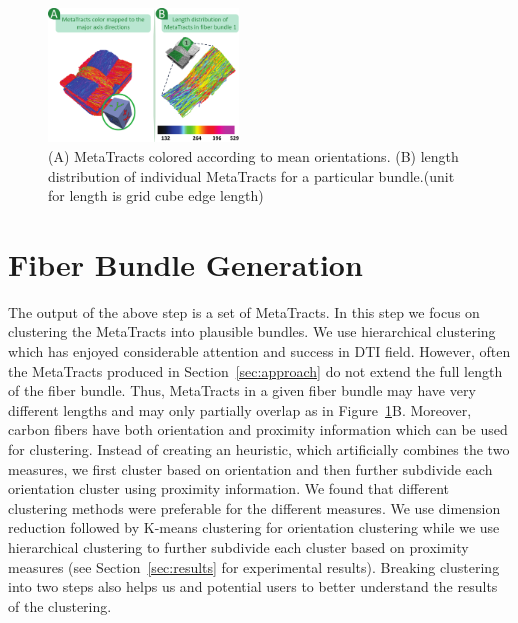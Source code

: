 

\begin{figure}[tb]
\centering
		\includegraphics[width=0.45\textwidth]{imagesMT2014/figure5.pdf}
	\caption{(A) MetaTracts colored according to mean orientations. (B) length distribution of individual MetaTracts for a particular bundle.(unit for length is grid cube edge length)}
	\label{fig:length_distribution}
\end{figure}


\section {Fiber Bundle Generation}
\label{subsec:fiber-bundles}
The output of the above step is a set of MetaTracts. In this step we focus on clustering the MetaTracts into plausible bundles. We use hierarchical clustering which has enjoyed considerable attention and success in DTI field. However, often the MetaTracts produced in Section~\ref{sec:approach} do not extend the full length of the fiber bundle. Thus, MetaTracts in a given fiber bundle may have very different lengths and may only partially overlap as in Figure~\ref{fig:length_distribution}B. Moreover, carbon fibers have both orientation and proximity information which can be used for clustering. Instead of creating an heuristic, which artificially combines the two measures, we first cluster based on orientation and then further subdivide each orientation cluster using proximity information. We found that different clustering methods were preferable for the different measures. We use dimension reduction followed by K-means clustering for orientation clustering while we use hierarchical clustering to further subdivide each cluster based on proximity measures (see Section~\ref{sec:results} for experimental results). Breaking clustering into two steps also helps us and potential users to better understand the results of the clustering.

